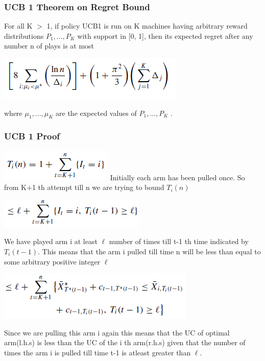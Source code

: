 \documentclass{beamer}
\begin{document}
\begin{frame}
\frametitle{UCB 1 Theorem on Regret Bound}
\begin{theorem}
For all K $>$ 1, if policy UCB1 is run on K machines having arbitrary reward
distributions $P_{1}, . . . , P_{K}$ with support in [0, 1], then its expected regret after any number
n of plays is at most
\begin{tabbing}
\includegraphics[scale=0.7]{img/theorem.png}
\end{tabbing}
where $\mu_{1}, . . . , \mu_{K}$ are the expected values of $P_{1}, . . . , P_{K}$ .
\end{theorem}
\end{frame}


\begin{frame}
\frametitle{UCB 1 Proof}

\includegraphics[scale=0.7]{img/line1.png}
Initially each arm has been pulled once. So from K+1 th attempt till n we are trying to bound $T_{i} (n)$

\begin{tabbing}
\hspace*{.25in}
\includegraphics[scale=0.7]{img/line2.png}
\end{tabbing}

We have played arm i at least $\ell$ number of times till t-1 th time indicated by $T_{i}(t-1)$. This means that the arm i pulled till time n will be less than equal to some arbitrary positive integer $\ell$

\begin{tabbing}
\hspace*{.25in}
\includegraphics[scale=0.7]{img/line3.png}
\end{tabbing}

Since we are pulling this arm i again this means that the UC of optimal arm(l.h.s) is less than the UC of the i th arm(r.h.s) given that the number of times the arm i is pulled till time t-1 is atleast greater than $\ell$. 

\end{frame}
\end{document}
